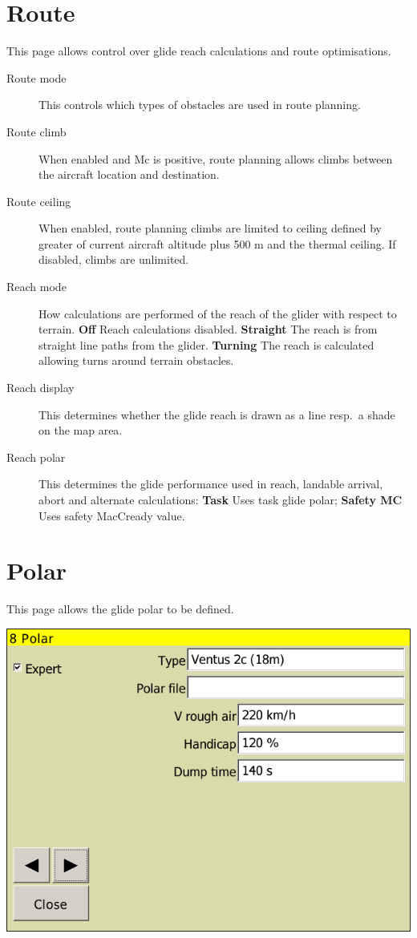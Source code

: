 \section{Route}

This page allows control over glide reach calculations and route
optimisations.

\begin{description}
\item[Route mode] \label{conf:routemode} This controls which types
of obstacles are used in route planning.
\item[Route climb] \label{conf:routeclimb} When enabled and Mc is positive, route planning allows climbs between the
  aircraft location and destination.
\item[Route ceiling] \label{conf:routeceiling} When enabled, route planning climbs are limited to ceiling defined by greater of current aircraft altitude plus 500 m and the thermal ceiling.  If disabled, climbs are unlimited.
\item[Reach mode] \label{conf:turningreach} How calculations are performed of the reach of the glider with respect to terrain. {\bf Off} Reach calculations disabled. {\bf Straight} The reach is from straight line paths from the glider. {\bf Turning} The reach is calculated allowing turns around terrain obstacles.
\item[Reach display]  \label{conf:gliderange} This determines whether the
glide reach is drawn as a line resp.\ a shade on the map area.
\item[Reach polar] \label{conf:reachpolar} This determines the glide performance used in reach, landable arrival, abort and alternate calculations: {\bf Task} Uses task glide polar; {\bf Safety MC} Uses safety MacCready value.
\end{description}

\clearpage
\section{Polar}

This page allows the glide polar to be defined.

\begin{center}
\includegraphics[angle=0,width=0.8\linewidth,keepaspectratio='true']{figures/config-polar.png}
\end{center}

